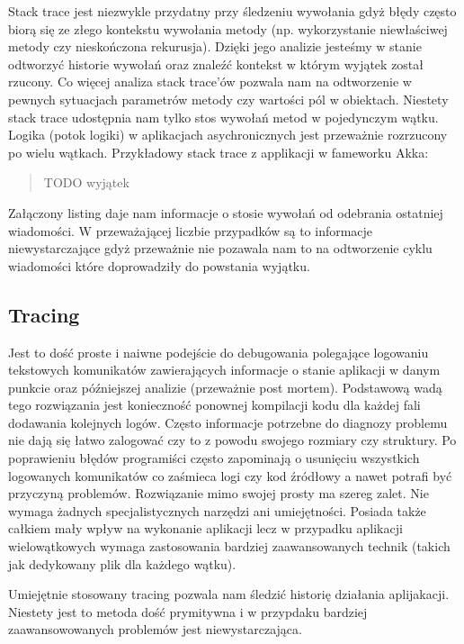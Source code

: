 Stack trace jest niezwykle przydatny przy śledzeniu wywołania gdyż błędy często biorą się ze złego kontekstu wywołania metody (np. wykorzystanie niewłaściwej metody czy nieskończona rekurusja). Dzięki jego analizie jesteśmy w stanie odtworzyć historie wywołań oraz znaleźć kontekst w którym wyjątek został rzucony. Co więcej analiza stack trace'ów pozwala nam na odtworzenie w pewnych sytuacjach parametrów metody czy wartości pól w obiektach.
Niestety stack trace udostępnia nam tylko stos wywołań metod w pojedynczym wątku. Logika (potok logiki) w aplikacjach asychronicznych jest przeważnie rozrzucony po wielu wątkach. Przykładowy stack trace z applikacji w fameworku Akka:

\begin{quote}
TODO wyjątek
\end{quote}

Załączony listing daje nam informacje o stosie wywołań od odebrania ostatniej wiadomości. W przeważającej liczbie przypadków są to informacje niewystarczające gdyż przeważnie nie pozawala nam to na odtworzenie cyklu wiadomości które doprowadziły do powstania wyjątku.

\subsection{Tracing}

Jest to dość proste i naiwne podejście do debugowania polegające logowaniu tekstowych komunikatów zawierających informacje o stanie aplikacji w danym punkcie oraz późniejszej analizie (przeważnie post mortem). Podstawową wadą tego rozwiązania jest konieczność ponownej kompilacji kodu dla każdej fali dodawania kolejnych logów. Często informacje potrzebne do diagnozy problemu nie dają się łatwo zalogować czy to z powodu swojego rozmiary czy struktury. Po poprawieniu błędów programiści często zapominają o usunięciu wszystkich logowanych komunikatów co zaśmieca logi czy kod źródłowy a nawet potrafi być przyczyną problemów.
Rozwiązanie mimo swojej prosty ma szereg zalet. Nie wymaga żadnych specjalistycznych narzędzi ani umiejętności. Posiada także całkiem mały wpływ na wykonanie aplikacji lecz w przypadku aplikacji wielowątkowych wymaga zastosowania bardziej zaawansowanych technik (takich jak dedykowany plik dla każdego wątku).

Umiejętnie stosowany tracing pozwala nam śledzić historię działania aplijakacji. Niestety jest to metoda dość prymitywna i w przypdaku bardziej zaawansowowanych problemów jest niewystarczająca.
 

